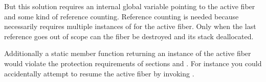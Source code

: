 But this solution requires an internal global variable pointing to the active
fiber and some kind of reference counting. Reference counting is needed because
 necessarily requires multiple instances of \fiber for the
active fiber. Only when the last reference goes out of scope can the fiber be
destroyed and its stack deallocated.

Additionally a static member function returning an instance of the active fiber
would violate the protection requirements of sections  and
. For instance you could accidentally attempt to resume
the active fiber by invoking \resume.

